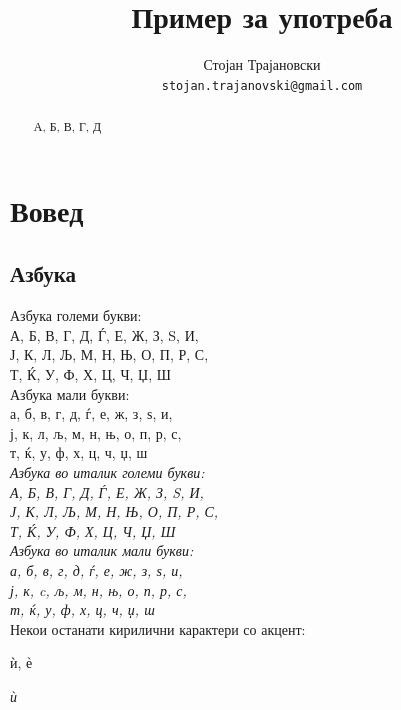 \documentclass[a4paper]{report}
\title{\selectlanguage{macedonian}Пример за употреба}
\author{Стојан Трајановски\\\texttt{stojan.trajanovski@gmail.com}}
\begin{document}
\maketitle

\begin{abstract}
А, Б, В, Г, Д
\end{abstract}


\tableofcontents


\chapter{Вовед}

\section{Азбука}
Азбука големи букви:\\
 А, Б, В, Г, Д, Ѓ, Е, Ж, З, S, И,\\
  Ј, К, Л, Љ, М, Н, Њ, О, П, Р, С,\\Т, Ќ, У, Ф, Х, Ц, Ч, Џ, Ш\\
 
 Азбука мали букви:\\
 а, б, в, г, д, ѓ, е, ж, з, ѕ, и,\\ ј, к, л, љ, м, н, њ, о, п, р, с,\\ т, ќ, у, ф, х, ц, ч, џ, ш\\
 
 
 
 
\textit{Азбука во италик големи букви: \\
А, Б, В, Г, Д, Ѓ, Е, Ж, З, S, И,\\ Ј, К, Л, Љ, М, Н, Њ, О, П, Р, С,\\ Т, Ќ, У, Ф, Х, Ц, Ч, Џ, Ш}\\

\textit{Азбука во италик мали букви:\\
 а, б, в, г, д, ѓ, е, ж, з, ѕ, и,\\ ј, к, c, љ, м, н, њ, о, п, р, с,\\ т, ќ, у, ф, х, ц, ч, џ, ш} \\
 
 
 
 Некои останати кирилични карактери со акцент:
 
 ѝ, ѐ
 
 
 \textit{ѝ}

 
\end{document}
